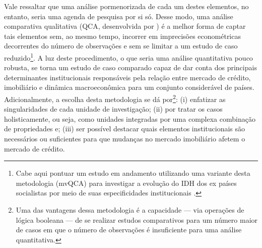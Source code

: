 Vale ressaltar que uma análise pormenorizada de cada um destes elementos, no entanto, seria uma agenda de pesquisa por si só. Desse modo, uma análise comparativa qualitativa (QCA, desenvolvida por \textcite{ragin_comparative_1989}) é a melhor forma de captar tais elementos sem, ao mesmo tempo, incorrer em imprecisões econométricas decorrentes do número de observações e sem se limitar a um estudo de caso reduzido\footnote{Cabe aqui pontuar um estudo em andamento utilizando uma variante desta metodologia (mvQCA) para investigar a evolução do IDH dos ex países socialistas por meio de suas especificidades institucionais \cite{petrini_comparacao_2019}.}. A luz deste procedimento, o que seria uma análise quantitativa pouco robusta, se torna um estudo de caso comparado capaz de dar conta dos principais determinantes institucionais responsáveis pela relação entre mercado de crédito, imobiliário e dinâmica macroeconômica para um conjunto considerável de países. Adicionalmente, a escolha desta metodologia se dá por\footnote{Uma das vantagens dessa metodologia é a capacidade --- via operações de lógica booleana --- de se realizar estudos comparativos para um número maior de casos em que o número de observações é insuficiente para uma análise quantitativa.}: (i) enfatizar as singularidades de cada unidade de investigação; (ii) por tratar os casos holisticamente, ou seja, como unidades integradas por uma complexa combinação de propriedades e; (iii) ser possível destacar quais elementos institucionais são necessários ou suficientes para que mudanças no mercado imobiliário afetem o mercado de crédito.

